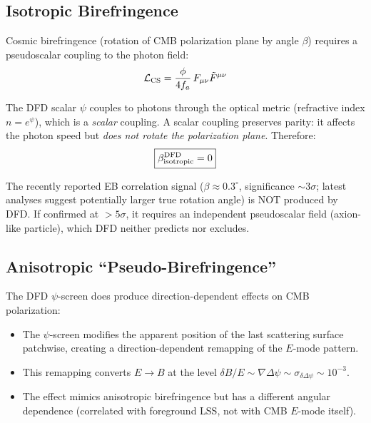 \documentclass[11pt,a4paper]{article}
\newcounter{findingctr}
\newenvironment{finding}[1][]{%
  \refstepcounter{findingctr}%
  \begin{tcolorbox}[colback=blue!3!white, colframe=blue!50!black,
    title=\textbf{Finding \thefindingctr: #1}]
}{%
  \end{tcolorbox}%
}
\newcommand{\Dpsi}{\Delta\psi}
\begin{document}
\begin{finding}[\textbf{Cosmic Birefringence}: DFD Predicts Zero Isotropic,
  Nonzero Anisotropic]

\subsection*{Isotropic Birefringence}

Cosmic birefringence (rotation of CMB polarization plane by angle
$\beta$) requires a pseudoscalar coupling to the photon field:
\begin{equation}
\mathcal{L}_{\rm CS} = \frac{\phi}{4 f_a}\,F_{\mu\nu}\tilde{F}^{\mu\nu}
\end{equation}

The DFD scalar $\psi$ couples to photons through the optical metric
(refractive index $n = e^\psi$), which is a \emph{scalar} coupling.
A scalar coupling preserves parity: it affects the photon speed but
\emph{does not rotate the polarization plane}.  Therefore:
\begin{equation}
\boxed{\beta^{\rm DFD}_{\rm isotropic} = 0}
\end{equation}

The recently reported EB correlation signal ($\beta \approx 0.3^\circ$,
significance $\sim 3\sigma$; latest analyses suggest potentially larger
true rotation angle) is NOT produced by DFD.  If confirmed at
$> 5\sigma$, it requires an independent pseudoscalar field (axion-like
particle), which DFD neither predicts nor excludes.

\subsection*{Anisotropic ``Pseudo-Birefringence''}

The DFD $\psi$-screen does produce direction-dependent effects on
CMB polarization:
\begin{itemize}[nosep]
\item The $\psi$-screen modifies the apparent position of
  the last scattering surface patchwise, creating a
  direction-dependent remapping of the $E$-mode pattern.
\item This remapping converts $E \to B$ at the level
  $\delta B / E \sim \nabla \Dpsi \sim \sigma_{\delta\Dpsi} \sim 10^{-3}$.
\item The effect mimics anisotropic birefringence but has a
  different angular dependence (correlated with foreground LSS,
  not with CMB $E$-mode itself).
\end{itemize}


\end{finding}
\end{document}
